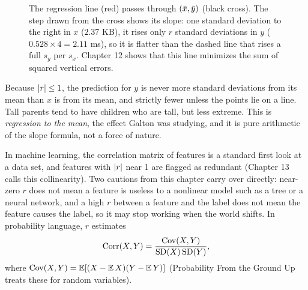 \begin{figure}[H]
\centering
{}
\caption{The regression line (red) passes through $(\bar{x},\bar{y})$ (black cross).
The step drawn from the cross shows its slope: one standard deviation to the
right in $x$ ($2.37$ KB), it rises only $r$ standard deviations in $y$
($0.528 \times 4 = 2.11$ ms), so it is flatter than the dashed line that rises a full $s_y$ per $s_x$.
Chapter 12 shows that this line minimizes the sum of squared vertical errors.}
\label{fig:two-variables-regression}
\end{figure}

Because $\lvert r\rvert \le 1$, the prediction for $y$ is never more standard deviations
from its mean than $x$ is from its mean, and strictly fewer unless the points lie
on a line. Tall parents tend to have children who are
tall, but less extreme. This is \emph{regression to the mean}, the effect Galton was
studying, and it is pure arithmetic of the slope formula, not a force of nature.

\begin{connectionbox}
In machine learning, the correlation matrix of features is a standard first look at
a data set, and features with $\lvert r\rvert$ near 1 are flagged as redundant (Chapter 13
calls this collinearity). Two cautions from this chapter carry over directly:
near-zero $r$ does not mean a feature is useless to a nonlinear model such as a tree
or a neural network, and a high $r$ between a feature and the label does not mean
the feature causes the label, so it may stop working when the world shifts.
In probability language, $r$ estimates
\[
  \operatorname{Corr}(X,Y) = \frac{\operatorname{Cov}(X,Y)}{\operatorname{SD}(X)\operatorname{SD}(Y)},
\]
where $\operatorname{Cov}(X,Y) = \operatorname{\mathbb{E}}[(X-\operatorname{\mathbb{E}} X)(Y-\operatorname{\mathbb{E}} Y)]$ (Probability From the Ground Up treats these
for random variables).
\end{connectionbox}

